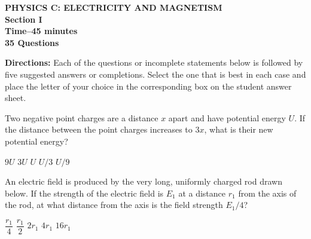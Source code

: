\documentclass[12pt]{../../oss-classkick-exam}
\begin{document}
\begin{center}
  \textbf{PHYSICS C: ELECTRICITY AND MAGNETISM\\
    Section I\\
    Time--45 minutes\\
    35 Questions
  }
\end{center}

\textbf{Directions:} Each of the questions or incomplete statements below is
followed by five suggested answers or completions. Select the one that is best
in each case and place the letter of your choice in the corresponding box on
the student answer sheet.

\begin{questions}
  \question Two negative point charges are a distance $x$ apart and have
  potential energy $U$. If the distance between the point charges increases to
  $3x$, what is their new potential energy?
  \begin{choices}
    \choice $9U$
    \choice $3U$
    \choice $U$
    \choice $U/3$
    \choice $U/9$
  \end{choices}

  \uplevel{\rule{\linewidth}{.5pt}}
  
  \question An electric field is produced by the very long, uniformly charged
  rod drawn below. If the strength of the electric field is $E_1$ at a distance
  $r_1$ from the axis of the rod, at what distance from the axis is
  the field strength $E_1/4$?

  \vspace{.1in}
  \begin{minipage}{.35\linewidth}
  \end{minipage}
  \begin{minipage}{.4\linewidth}
    \begin{choices}
      \choice $\dfrac{r_1}4$
      \choice  $\dfrac{r_1}2$
      \choice $2r_1$
      \choice $4r_1$
      \choice $16r_1$
    \end{choices}
  \end{minipage}
  


\end{questions}
\end{document}
